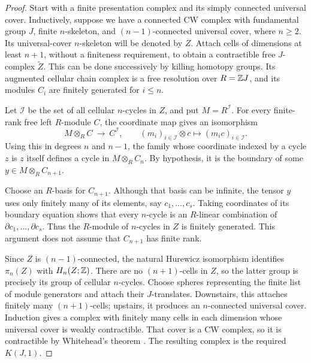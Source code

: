 \begin{proof}
Start with a finite presentation complex and its simply connected
universal cover.  Inductively, suppose we have a connected CW complex
with fundamental group $J$, finite $n$-skeleton, and
$(n-1)$-connected universal cover, where $n\ge2$.  Its universal-cover
$n$-skeleton will be denoted by $Z$.  Attach cells of dimensions at
least $n+1$, without a finiteness requirement, to obtain a contractible
free $J$-complex $\widetilde Z$.  This can be done successively by
killing homotopy groups.  Its augmented cellular chain complex is a
free resolution over $R=\mathbb Z J$, and its modules $C_i$ are finitely
generated for $i\le n$.

Let $\mathcal I$ be the set of all cellular $n$-cycles in $Z$, and put
$M=R^{\mathcal I}$.  For every finite-rank free left $R$-module $C$,
the coordinate map gives an isomorphism
\begin{equation}\label{eq:finite-rank-product-tensor}
 M\otimes_R C\ \longrightarrow\ C^{\mathcal I},
 \qquad (m_i)_{i\in\mathcal I}\otimes c
             \longmapsto (m_i c)_{i\in\mathcal I}.
\end{equation}
Using this in degrees $n$ and $n-1$, the family whose coordinate
indexed by a cycle $z$ is $z$ itself defines a cycle in
$M\otimes_R C_n$.  By hypothesis, it is the boundary of some
$y\in M\otimes_R C_{n+1}$.

Choose an $R$-basis for $C_{n+1}$.  Although that basis can be infinite,
the tensor $y$ uses only finitely many of its elements,
say $c_1,\ldots,c_s$.  Taking coordinates of its boundary equation
shows that every $n$-cycle is an $R$-linear combination of
$\partial c_1,\ldots,\partial c_s$.  Thus the $R$-module of
$n$-cycles in $Z$ is finitely generated.  This argument does not assume
that $C_{n+1}$ has finite rank.

Since $Z$ is $(n-1)$-connected, the natural Hurewicz isomorphism
\citep[Theorem~4.37]{Hatcher2002} identifies
$\pi_n(Z)$ with $H_n(Z;\mathbb Z)$.  There are no $(n+1)$-cells in $Z$,
so the latter group is precisely its group of cellular $n$-cycles.
Choose spheres representing the finite list of module generators and
attach their $J$-translates.  Downstairs, this attaches finitely many
$(n+1)$-cells; upstairs, it produces an $n$-connected universal cover.
Induction gives a complex with finitely many cells in each dimension
whose universal cover is weakly contractible.  That cover is a CW
complex, so it is contractible by Whitehead's theorem
\citep[Theorem~4.5]{Hatcher2002}.  The resulting complex is the required
$K(J,1)$.
\end{proof}

